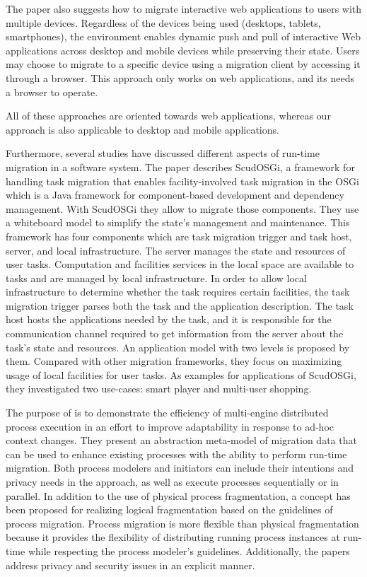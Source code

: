 The paper \cite{r6-10.1145/2254556.2254563} also suggests how to migrate interactive web applications to users with multiple devices.
Regardless of the devices being used (desktops, tablets, smartphones), the environment enables dynamic push and pull of interactive Web applications across desktop and mobile devices while preserving their state.
Users may choose to migrate to a specific device using a migration client by accessing it through a browser.
This approach only works on web applications, and its needs a browser to operate.

All of these approaches are oriented towards web applications, whereas our approach is also applicable to desktop and mobile applications.

Furthermore, several studies have discussed different aspects of run-time migration in a software system. The paper \cite{r4-5392926} describes ScudOSGi, a framework for handling task migration that enables facility-involved task migration in the OSGi which is a Java framework for component-based development and dependency management. With ScudOSGi they allow to migrate those components.
They use a whiteboard model to simplify the state’s management and maintenance.
This framework has four components which are task migration trigger and task host, server, and local infrastructure. 
The server manages the state and resources of user tasks.
Computation and facilities services in the local space are available to tasks and are managed by local infrastructure.
In order to allow local infrastructure to determine whether the task requires certain facilities, the task migration trigger parses both the task and the application description.
The task host hosts the applications needed by the task, and it is responsible for the communication channel required to get information from the server about the task’s state and resources.
An application model with two levels is proposed by them. 
Compared with other migration frameworks, they focus on maximizing usage of local facilities for user tasks.
As examples for applications of ScudOSGi, they investigated two use-cases: smart player and multi-user shopping.

The purpose of \cite{r3-10.1145/2556288.2557199} is to demonstrate the efficiency of multi-engine distributed process execution in an effort to improve adaptability in response to ad-hoc context changes.
They present an abstraction meta-model of migration data that can be used to enhance existing processes with the ability to perform run-time migration.
Both process modelers and initiators can include their intentions and privacy needs in the approach, as well as execute processes sequentially or in parallel.
In addition to the use of physical process fragmentation, a concept has been proposed for realizing logical fragmentation based on the guidelines of process migration.
Process migration is more flexible than physical fragmentation because it provides the flexibility of distributing running process instances at run-time while respecting the process modeler’s guidelines.
Additionally, the papers address privacy and security issues in an explicit manner.

